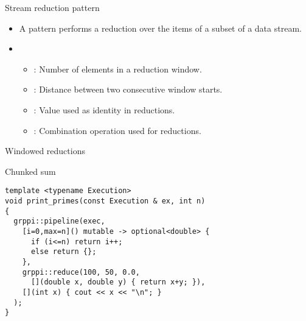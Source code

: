 \begin{frame}[t]{Stream reduction pattern}
\begin{itemize}
  \item A  pattern performs a reduction over the items of a
        subset of a data stream.
  \vfill\pause
  \item {}
    \begin{itemize}
      \item {}: Number of elements in a reduction window.
      \item {}: Distance between two consecutive window starts.
      \item {}: Value used as identity in reductions.
      \item {}: Combination operation used for reductions.
    \end{itemize}
\end{itemize}
\end{frame}

\begin{frame}[t,fragile]{Windowed reductions}
\begin{block}{Chunked sum}
\begin{lstlisting}
template <typename Execution>
void print_primes(const Execution & ex, int n)
{
  grppi::pipeline(exec,
    [i=0,max=n]() mutable -> optional<double> {
      if (i<=n) return i++;
      else return {};
    },
    grppi::reduce(100, 50, 0.0,
      [](double x, double y) { return x+y; }),
    [](int x) { cout << x << "\n"; }
  );
}
\end{lstlisting}
\end{block}
\end{frame}
